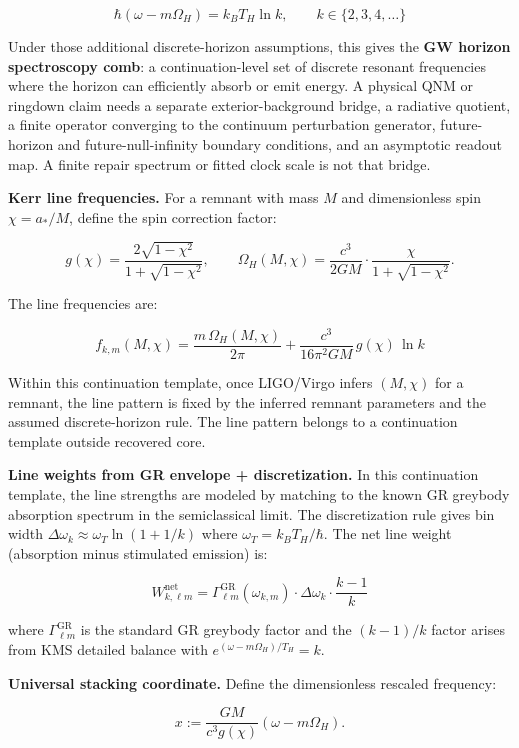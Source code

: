 \[
\hbar(\omega - m\Omega_H) = k_B T_H \ln k, \qquad k \in \{2, 3, 4, \ldots\}
\]

Under those additional discrete-horizon assumptions, this gives the \textbf{GW horizon spectroscopy comb}: a continuation-level set of discrete resonant frequencies where the horizon can efficiently absorb or emit energy. A physical QNM or ringdown claim needs a separate exterior-background bridge, a radiative quotient, a finite operator converging to the continuum perturbation generator, future-horizon and future-null-infinity boundary conditions, and an asymptotic readout map. A finite repair spectrum or fitted clock scale is not that bridge.

\textbf{Kerr line frequencies.} For a remnant with mass \(M\) and dimensionless spin \(\chi = a_*/M\), define the spin correction factor:

\[
g(\chi) = \frac{2\sqrt{1-\chi^2}}{1+\sqrt{1-\chi^2}}, \qquad
\Omega_H(M,\chi) = \frac{c^3}{2GM} \cdot \frac{\chi}{1+\sqrt{1-\chi^2}}.
\]

The line frequencies are:

\[
f_{k,m}(M,\chi) = \frac{m \, \Omega_H(M,\chi)}{2\pi} + \frac{c^3}{16\pi^2 GM} \, g(\chi) \, \ln k
\]

Within this continuation template, once LIGO/Virgo infers \((M, \chi)\) for a remnant, the line pattern is fixed by the inferred remnant parameters and the assumed discrete-horizon rule. The line pattern belongs to a continuation template outside recovered core.

\textbf{Line weights from GR envelope + discretization.} In this continuation template, the line strengths are modeled by matching to the known GR greybody absorption spectrum in the semiclassical limit. The discretization rule gives bin width \(\Delta\omega_k \approx \omega_T \ln(1 + 1/k)\) where \(\omega_T = k_B T_H/\hbar\). The net line weight (absorption minus stimulated emission) is:

\[
W^{\mathrm{net}}_{k,\ell m} = \Gamma^{\mathrm{GR}}_{\ell m}(\omega_{k,m}) \cdot \Delta\omega_k \cdot \frac{k-1}{k}
\]

where \(\Gamma^{\mathrm{GR}}_{\ell m}\) is the standard GR greybody factor and the \((k-1)/k\) factor arises from KMS detailed balance with \(e^{(\omega-m\Omega_H)/T_H} = k\).

\textbf{Universal stacking coordinate.} Define the dimensionless rescaled frequency:

\[
x := \frac{GM}{c^3 g(\chi)}(\omega - m\Omega_H).
\]


